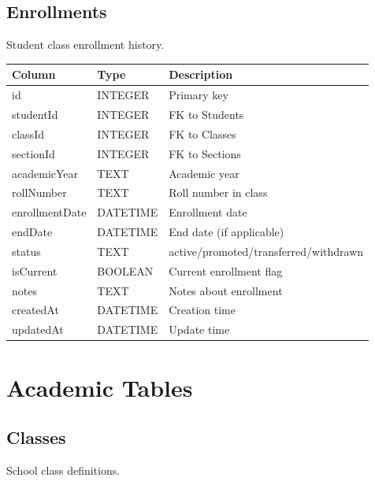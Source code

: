 \documentclass[12pt,a4paper]{report}
\begin{document}
\section{Enrollments}

Student class enrollment history.

\begin{longtable}{@{}p{4cm}p{2.5cm}p{6.5cm}@{}}
\toprule
\textbf{Column} & \textbf{Type} & \textbf{Description} \\
\midrule
\endhead
id & INTEGER & Primary key \\
studentId & INTEGER & FK to Students \\
classId & INTEGER & FK to Classes \\
sectionId & INTEGER & FK to Sections \\
academicYear & TEXT & Academic year \\
rollNumber & TEXT & Roll number in class \\
enrollmentDate & DATETIME & Enrollment date \\
endDate & DATETIME & End date (if applicable) \\
status & TEXT & active/promoted/transferred/withdrawn \\
isCurrent & BOOLEAN & Current enrollment flag \\
notes & TEXT & Notes about enrollment \\
createdAt & DATETIME & Creation time \\
updatedAt & DATETIME & Update time \\
\bottomrule
\end{longtable}

\chapter{Academic Tables}

\section{Classes}

School class definitions.
\end{document}

